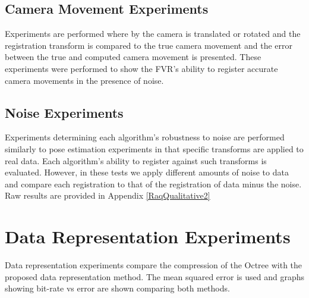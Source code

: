\subsection{Camera Movement Experiments}

Experiments are performed where by the camera is translated or rotated and the registration transform is compared to the true camera movement and the error between the true and computed camera movement is presented. These experiments were performed to show the FVR's ability to register accurate camera movements in the presence of noise.

\subsection{Noise Experiments}

Experiments determining each algorithm's robustness to noise are performed similarly to pose estimation experiments in that specific transforms are applied to real data. Each algorithm's ability to register against such transforms is evaluated. However, in these tests we apply different amounts of noise to data and compare each registration to that of the registration of data minus the noise. Raw results are provided in Appendix \ref{RaqQualitative2}


\section{Data Representation Experiments}

Data representation experiments compare the compression of the Octree with the proposed data representation method. The mean squared error is used and graphs showing bit-rate vs error are shown comparing both methods.
